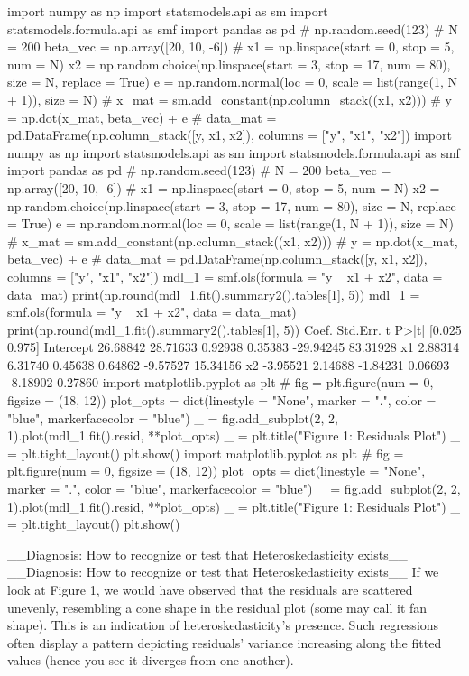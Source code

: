 import numpy as np
import statsmodels.api as sm
import statsmodels.formula.api as smf
import pandas as pd
#
np.random.seed(123)
#
N = 200
beta_vec = np.array([20, 10, -6])
#
x1 = np.linspace(start = 0, stop = 5, num = N)
x2 = np.random.choice(np.linspace(start = 3, stop = 17, num = 80), size = N, replace = True)
e  = np.random.normal(loc = 0, scale = list(range(1, N + 1)), size = N)
#
x_mat = sm.add_constant(np.column_stack((x1, x2)))
#
y = np.dot(x_mat, beta_vec) + e
#
data_mat = pd.DataFrame(np.column_stack([y, x1, x2]), columns = ["y", "x1", "x2"])
import numpy as np
import statsmodels.api as sm
import statsmodels.formula.api as smf
import pandas as pd
#
np.random.seed(123)
#
N = 200
beta_vec = np.array([20, 10, -6])
#
x1 = np.linspace(start = 0, stop = 5, num = N)
x2 = np.random.choice(np.linspace(start = 3, stop = 17, num = 80), size = N, replace = True)
e  = np.random.normal(loc = 0, scale = list(range(1, N + 1)), size = N)
#
x_mat = sm.add_constant(np.column_stack((x1, x2)))
#
y = np.dot(x_mat, beta_vec) + e
#
data_mat = pd.DataFrame(np.column_stack([y, x1, x2]), columns = ["y", "x1", "x2"])
mdl_1 = smf.ols(formula = "y ~ x1 + x2", data = data_mat)
print(np.round(mdl_1.fit().summary2().tables[1], 5))
mdl_1 = smf.ols(formula = "y ~ x1 + x2", data = data_mat)
print(np.round(mdl_1.fit().summary2().tables[1], 5))
              Coef.  Std.Err.        t    P>|t|    [0.025    0.975]
Intercept  26.68842  28.71633  0.92938  0.35383 -29.94245  83.31928
x1          2.88314   6.31740  0.45638  0.64862  -9.57527  15.34156
x2         -3.95521   2.14688 -1.84231  0.06693  -8.18902   0.27860
import matplotlib.pyplot as plt
#
fig = plt.figure(num = 0, figsize = (18, 12))
plot_opts = dict(linestyle = "None", marker = ".", color = "blue", markerfacecolor = "blue")
_ = fig.add_subplot(2, 2, 1).plot(mdl_1.fit().resid, **plot_opts)
_ = plt.title("Figure 1: Residuals Plot")
_ = plt.tight_layout()
plt.show()
import matplotlib.pyplot as plt
#
fig = plt.figure(num = 0, figsize = (18, 12))
plot_opts = dict(linestyle = "None", marker = ".", color = "blue", markerfacecolor = "blue")
_ = fig.add_subplot(2, 2, 1).plot(mdl_1.fit().resid, **plot_opts)
_ = plt.title("Figure 1: Residuals Plot")
_ = plt.tight_layout()
plt.show()

__Diagnosis: How to recognize or test that Heteroskedasticity exists__ 
__Diagnosis: How to recognize or test that Heteroskedasticity exists__ 
If we look at Figure 1, we would have observed that the residuals are scattered unevenly, resembling a cone shape in the residual plot (some may call it fan shape). This is an indication of heteroskedasticity’s presence. Such regressions often display a pattern depicting residuals’ variance increasing along the fitted values (hence you see it diverges from one another).

